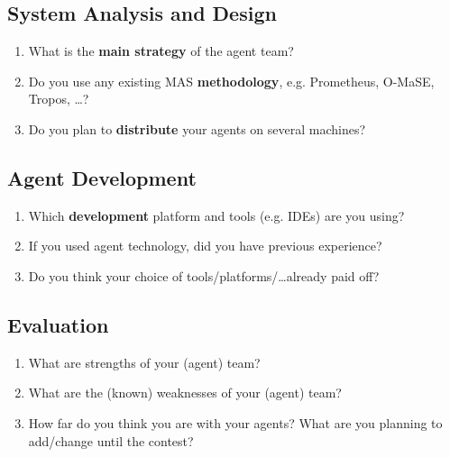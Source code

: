 \documentclass{article}
\begin{document}
\subsection*{System Analysis and Design}

\begin{enumerate}
  \item What is the \textbf{main strategy} of the agent team?
  \item Do you use any existing MAS \textbf{methodology}, e.g. Prometheus, O-MaSE, Tropos, \dots?
  \item Do you plan to \textbf{distribute} your agents on several machines?
\end{enumerate}

\subsection*{Agent Development}

\begin{enumerate}
  \item Which \textbf{development} platform and tools (e.g. IDEs) are you using?
  \item If you used agent technology, did you have previous experience?
  \item Do you think your choice of tools/platforms/\dots already paid off?
\end{enumerate}

\subsection*{Evaluation}

\begin{enumerate}
  \item What are strengths of your (agent) team?
  \item What are the (known) weaknesses of your (agent) team?
  \item How far do you think you are with your agents? What are you planning to add/change until the contest?
\end{enumerate}
\end{document}

